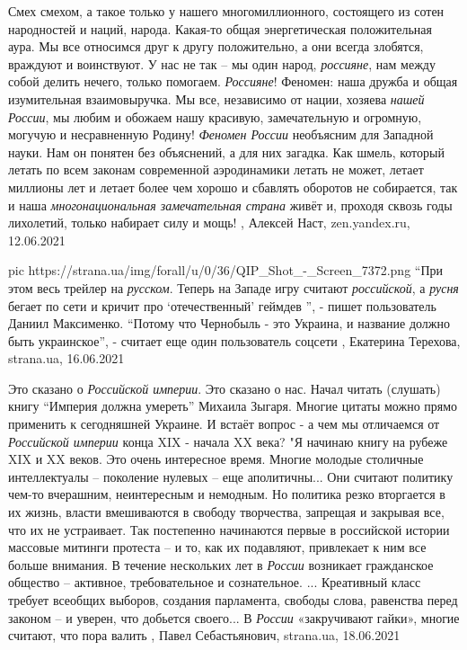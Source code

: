 Смех смехом, а такое только у нашего многомиллионного, состоящего из сотен
народностей и наций, народа. Какая-то общая энергетическая положительная аура.
Мы все относимся друг к другу положительно, а они всегда злобятся, враждуют и
воинствуют. У нас не так -- мы один народ, \emph{россияне}, нам между собой делить
нечего, только помогаем. \emph{Россияне}!  Феномен: наша дружба и общая изумительная
взаимовыручка. Мы все, независимо от нации, хозяева \emph{нашей России}, мы любим и
обожаем нашу красивую, замечательную и огромную, могучую и несравненную Родину!
\emph{Феномен России} необъясним для Западной науки. Нам он понятен без объяснений, а
для них загадка. Как шмель, который летать по всем законам современной
аэродинамики летать не может, летает миллионы лет и летает более чем хорошо и
сбавлять оборотов не собирается, так и наша \emph{многонациональная замечательная
страна} живёт и, проходя сквозь годы лихолетий, только набирает силу и мощь!
, 
Алексей Наст, zen.yandex.ru, 12.06.2021

\ifcmt
  pic https://strana.ua/img/forall/u/0/36/QIP_Shot_-_Screen_7372.png
\fi
\enquote{При этом весь трейлер на \emph{русском}. Теперь на Западе игру считают
\emph{российской}, а \emph{русня} бегает по сети и кричит про \enquote{отечественный} геймдев
}, - пишет пользователь Даниил Максименко.  \enquote{Потому что Чернобыль - это
Украина, и название должно быть украинское}, - считает еще один пользователь
соцсети
, 
Екатерина Терехова, strana.ua, 16.06.2021

Это сказано о \emph{Российской империи}. Это сказано о нас.  Начал читать
(слушать) книгу \enquote{Империя должна умереть} Михаила Зыгаря. Многие цитаты
можно прямо применить к сегодняшней Украине. И встаёт вопрос - а чем мы
отличаемся от \emph{Российской империи} конца XIX - начала XX века?  "Я начинаю
книгу на рубеже XIX и XX веков. Это очень интересное время. Многие молодые
столичные интеллектуалы – поколение нулевых – еще аполитичны... Они считают
политику чем-то вчерашним, неинтересным и немодным. Но политика резко
вторгается в их жизнь, власти вмешиваются в свободу творчества, запрещая и
закрывая все, что их не устраивает. Так постепенно начинаются первые в
российской истории массовые митинги протеста – и то, как их подавляют,
привлекает к ним все больше внимания. В течение нескольких лет в \emph{России}
возникает гражданское общество – активное, требовательное и сознательное.
... Креативный класс требует всеобщих выборов, создания парламента, свободы
слова, равенства перед законом – и уверен, что добьется своего... В
\emph{России} «закручивают гайки», многие считают, что пора валить
, 
Павел Себастьянович, strana.ua, 18.06.2021


